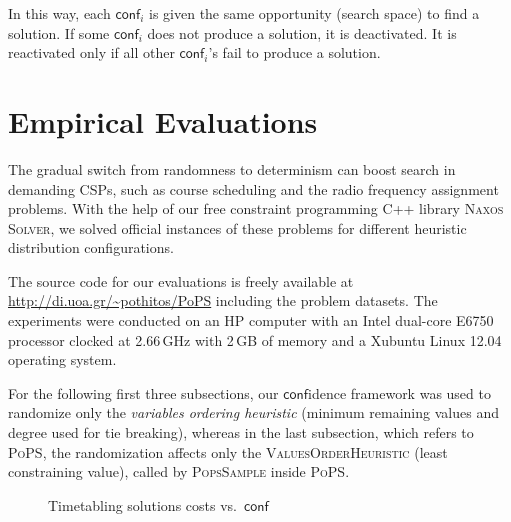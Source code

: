 \documentclass{ws-ijait}
\begin{document}
In this way, each $\mathsf{conf}_i$ is given the same opportunity (search space) to find a solution. If some $\mathsf{conf}_i$ does not produce a solution, it is deactivated. It is reactivated only if all other $\mathsf{conf}_i$'s fail to produce a solution.


\section{Empirical Evaluations}

The gradual switch from randomness to determinism can boost search in demanding CSPs, such as course scheduling and the radio frequency assignment problems. With the help of our free constraint programming C++ library \textsc{Naxos Solver},\cite{naxos-solver} we solved official instances of these problems for different heuristic distribution configurations.

The source code for our evaluations is freely available at \url{http://di.uoa.gr/~pothitos/PoPS} including the problem datasets. The experiments were conducted on an HP computer with an Intel dual-core E6750 processor clocked at 2.66\,GHz with 2\,GB of memory and a Xubuntu Linux 12.04 operating system.

For the following first three subsections, our $\mathsf{conf}$idence framework was used to randomize only the \emph{variables ordering heuristic} (minimum remaining values and degree used for tie breaking), whereas in the last subsection, which refers to \textsc{PoPS}, the randomization affects only the \textsc{ValuesOrderHeuristic} (least constraining value), called by \textsc{PopsSample} inside \textsc{PoPS}.



\begin{figure}
\centering

\caption{Timetabling solutions costs vs.\ $\mathsf{conf}$\label{costsA}}
\end{figure}
\end{document}
